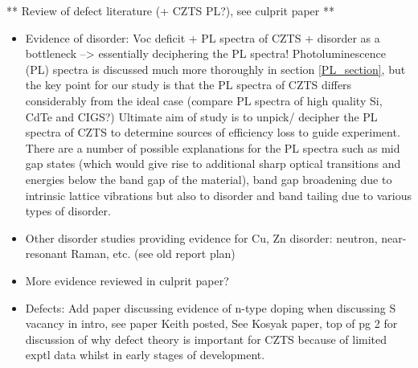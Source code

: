 ** Review of defect literature (+ CZTS PL?), see culprit paper **
\begin{itemize}
\item Evidence of disorder: Voc deficit + PL spectra of CZTS + disorder as a bottleneck --> essentially deciphering the PL spectra!
Photoluminescence (PL) spectra is discussed much more thoroughly in section \ref{PL_section}, but the key point for our study is that the PL spectra of CZTS differs considerably from the ideal case
(compare PL spectra of high quality Si, CdTe and CIGS?)
Ultimate aim of study is to unpick/ decipher the PL spectra of CZTS to determine sources of efficiency loss to guide experiment. There are a number of possible explanations for the PL spectra such as mid gap states (which would give rise to additional sharp optical transitions and energies below the band gap of the material),  band gap broadening due to intrinsic lattice vibrations but also to disorder and band tailing due to various types of disorder.
\item Other disorder studies providing evidence for Cu, Zn disorder: neutron, near-resonant Raman, etc. (see old report plan)
\item More evidence reviewed in culprit paper?
\item Defects: Add paper discussing evidence of n-type doping when discussing S vacancy in intro,  see paper Keith posted, See Kosyak paper, top of pg 2 for discussion of why defect theory is important for CZTS because of limited exptl data whilst in early stages of development.
\end{itemize}


